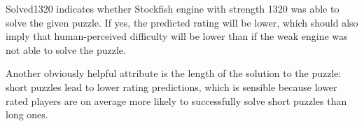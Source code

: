 \documentclass[sigconf,nonacm]{acmart}
\begin{document}
Solved1320 indicates whether Stockfish engine with strength 1320 was able to solve the given puzzle. If yes, the predicted rating will be lower, which should also imply that human-perceived difficulty will be lower than if the weak engine was not able to solve the puzzle.

Another obviously helpful attribute is the length of the solution to the puzzle: short puzzles lead to lower rating predictions, which is sensible because lower rated players are on average more likely to successfully solve short puzzles than long ones.



\end{document}
